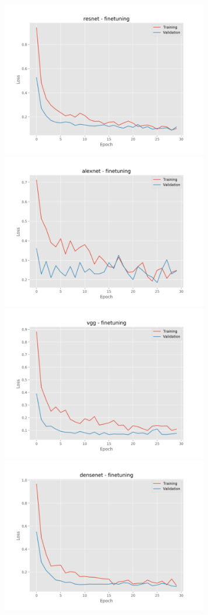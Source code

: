 \documentclass[]{kththesis}
\begin{document}
  \begin{figure}[h]
    \includegraphics[width=9cm]{r_l_resnet_fine}
    \includegraphics[width=9cm]{r_l_alexnet_fine}
    \includegraphics[width=9cm]{r_l_vgg_fine}
    \includegraphics[width=9cm]{r_l_densenet_fine}

\end{figure}
\end{document}
